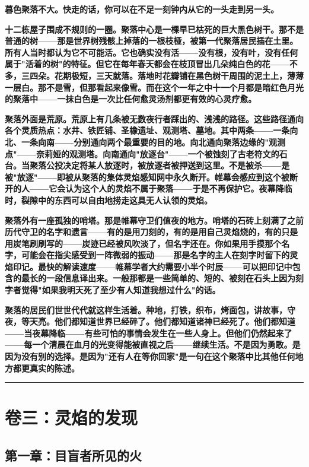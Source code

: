 \documentclass[12pt,a4paper,openany]{ctexbook}
\begin{document}
\textbf{暮色聚落不大。快走的话，你可以在不足一刻钟内从它的一头走到另一头。}


\textbf{十二栋屋子围成不规则的一圈。聚落中心是一棵早已枯死的巨大黑色树干。那不是普通的树——那是世界树残骸上掉落的一根枝桠，被第一代聚落居民插在土里。所有人当时都认为它不可能活。它也确实没有活——没有根，没有叶，没有任何属于"活着的树"的特征。但它在每年春天都会在枝顶冒出几朵纯白色的花——不多，三四朵。花期极短，三天就落。落地时花瓣铺在黑色树干周围的泥土上，薄薄一层白。那不是雪，但那看起来像雪。而在这个一年之中十一个月都是暗红色月光的聚落中——一抹白色是一次比任何愈灵汤剂都更有效的心灵疗愈。}


\textbf{聚落外面是荒原。荒原上有几条被无数夜行者踩出的、浅浅的路径。这些路径通向各个灵质热点：水井、铁匠铺、圣橡遗址、观测塔、墓地。其中两条——一条向北、一条向南——分别通向两个最重要的目的地。向北通向聚落边缘的"观测点"——奈莉娅的观测塔。向南通向"放逐台"——一个被蚀刻了古老符文的石台。当聚落公投决定将某人放逐时，被放逐者被押送到这里。不是被杀——是被"放逐"——即被从聚落的集体灵焰感知网中永久断开。帷幕会感应到这个被断开的人——它会认为这个人的灵焰不属于聚落——于是不再保护它。夜幕降临时，裂隙中的东西可以自由地捞走这具无人认领的灵焰。}


\textbf{聚落外有一座孤独的哨塔。那是帷幕守卫们值夜的地方。哨塔的石砖上刻满了之前历代守卫的名字和遗言——有的是用刀刻的，有的是用自己灵焰烧的，有的只是用炭笔刷刷写的——炭迹已经被风吹淡了，但名字还在。你如果用手摸那个名字，可能会在指尖感受到一阵微弱的振动——那是名字的主人在刻字时留下的灵焰印记。最快的解读速度——帷幕学者大约需要小半个时辰——可以把印记中包含的最长的一段信息译出来。一般那都是一些简单的、短的、被刻在石头上因为刻字者觉得"如果我明天死了至少有人知道我想过什么"的话。}


\textbf{聚落的居民们世世代代就这样生活着。种地，打铁，织布，烤面包，讲故事，守夜，等天亮。他们都知道世界已经碎了。他们都知道诸神已经死了。他们都知道——当夜幕降临——有些可怕的事情会发生在一些人身上。但他们仍然起来了——每一个清晨在血月的光变得能被直视之后——继续生活。不是因为勇敢。是因为没有别的选择。是因为"还有人在等你回家"是一句在这个聚落中比其他任何地方都更真实的陈述。}


\bigskip\hrule\bigskip


\chapter{卷三：灵焰的发现}


\section*{第一章：目盲者所见的火}
\end{document}
